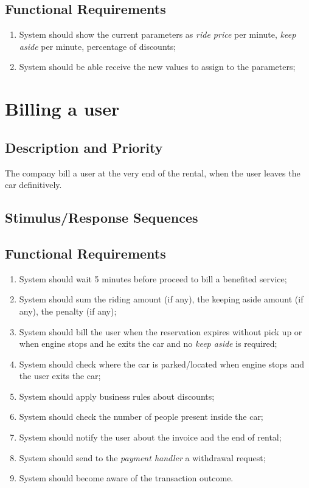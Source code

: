 \documentclass{scrreprt}
\begin{document}
\subsection{Functional Requirements}
\begin{enumerate}[label=R\arabic*.,resume]
\item System should show the current parameters as \emph{ride price} per minute, \emph{keep aside} per minute, percentage of discounts;
\item System should be able receive the new values to assign to the parameters;
\end{enumerate}

\section{Billing a user}
\subsection{Description and Priority}
The company bill a user at the very end of the rental, when the user leaves the car definitively.

\subsection{Stimulus/Response Sequences}
\subsection{Functional Requirements}
\begin{enumerate}[label=R\arabic*.,resume]
\item System should wait 5 minutes before proceed to bill a benefited service;
\item System should sum the riding amount (if any), the keeping aside amount (if any), the penalty (if any);
\item System should bill the user when the reservation expires without pick up or when engine stops and he exits the car and no \emph{keep aside} is required;
\item System should check where the car is parked/located when engine stops and the user exits the car;
\item System should apply business rules about discounts;
\item System should check the number of people present inside the car;
\item System should notify the user about the invoice and the end of rental;
\item System should send to the \emph{payment handler} a withdrawal request;
\item System should become aware of the transaction outcome.

\end{enumerate}
\end{document}
